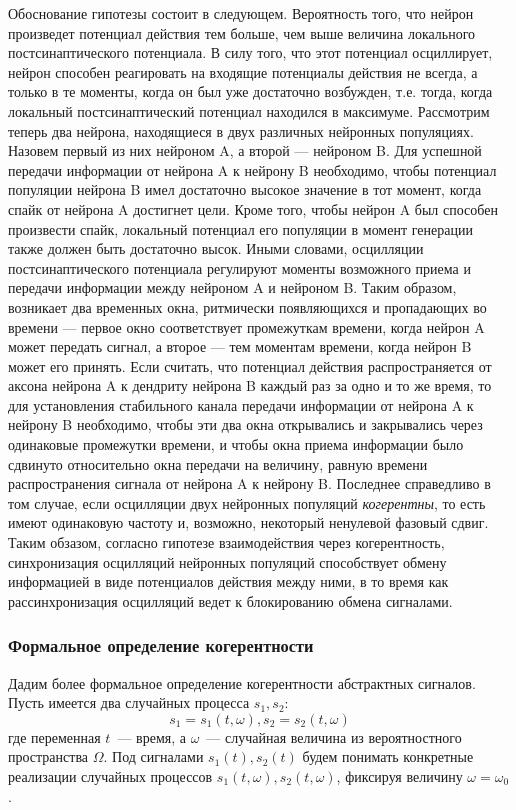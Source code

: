Обоснование гипотезы состоит в следующем.
Вероятность того, что нейрон произведет потенциал действия тем больше, чем выше
величина локального постсинаптического потенциала. В силу того, что этот потенциал осциллирует,
нейрон способен реагировать на входящие потенциалы действия не всегда, а только в те моменты,
когда он был уже достаточно возбужден, т.е. тогда, когда локальный постсинаптический потенциал
находился в максимуме. Рассмотрим теперь два нейрона, находящиеся в двух различных нейронных
популяциях. Назовем первый из них нейроном A, а второй --- нейроном B.
Для успешной передачи информации от нейрона A к нейрону B
необходимо, чтобы потенциал популяции нейрона B имел достаточно высокое значение в тот момент,
когда спайк от нейрона A достигнет цели. Кроме того, чтобы нейрон A был способен произвести
спайк, локальный потенциал его популяции в момент генерации также должен быть достаточно высок.
Иными словами, осцилляции постсинаптического потенциала регулируют моменты возможного
приема и передачи информации между нейроном A и нейроном B. Таким образом, возникает два
временных окна, ритмически появляющихся и пропадающих во времени --- первое окно
соответствует промежуткам времени, когда нейрон A может передать сигнал, а второе --- тем
моментам времени, когда нейрон B может его принять.
Если считать, что потенциал действия распространяется от аксона нейрона A к дендриту нейрона B
каждый раз за одно и то же время, то для установления стабильного канала передачи информации от
нейрона A к нейрону B необходимо, чтобы эти два окна открывались и закрывались через
одинаковые промежутки времени, и чтобы окна приема информации было сдвинуто относительно
окна передачи на величину, равную времени распространения сигнала от нейрона A к нейрону B.
Последнее справедливо в том случае, если осцилляции двух нейронных популяций \emph{когерентны},
то есть имеют одинаковую частоту и, возможно, некоторый ненулевой фазовый сдвиг.
Таким обзазом, согласно гипотезе взаимодействия через когерентность, синхронизация осцилляций
нейронных популяций способствует обмену информацией в виде потенциалов действия между ними,
в то время как рассинхронизация осцилляций ведет к блокированию обмена сигналами.


\subsubsection{Формальное определение когерентности}
Дадим более формальное определение когерентности абстрактных сигналов.
Пусть имеется два случайных процесса $s_1, s_2$:
\begin{equation}
    s_1 = s_1(t,\omega), s_2 = s_2(t,\omega)
\end{equation}
где переменная $t$~--- время, а $\omega$~--- случайная величина из вероятностного пространства $\Omega$.
Под сигналами $s_1(t), s_2(t)$ будем понимать конкретные реализации случайных процессов
$s_1(t,\omega), s_2(t,\omega)$, фиксируя величину $\omega = \omega_0$.

